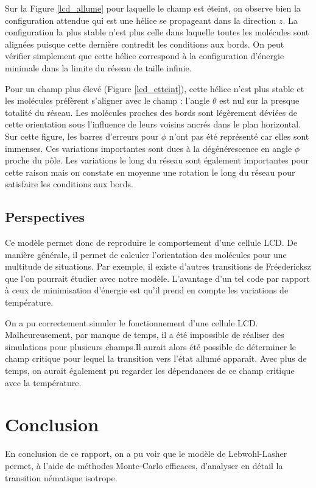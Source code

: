 \documentclass[11pt,a4paper]{article}
\numberwithin{equation}{section}
\begin{document}
Sur la Figure \ref{lcd_allume} pour laquelle le champ est éteint, on observe bien la configuration attendue qui est une hélice se propageant dans la direction $z$. 
La configuration la plus stable n'est plus celle dans laquelle toutes les molécules sont alignées puisque cette dernière contredit les conditions aux bords. On peut vérifier simplement que cette hélice correspond à la configuration d'énergie minimale dans la limite du réseau de taille infinie. 
\medskip

Pour un champ plus élevé (Figure \ref{lcd_etteint}), cette hélice n'est plus stable et les molécules préfèrent s'aligner avec le champ : l'angle $\theta$ est nul sur la presque totalité du réseau. Les molécules proches des bords sont légèrement déviées de cette orientation sous l'influence de leurs voisins ancrés dans le plan horizontal. Sur cette figure, les barres d'erreurs pour $\phi$ n'ont pas été représenté car elles sont immenses. Ces variations importantes sont dues à la dégénérescence en angle $\phi$ proche du pôle. Les variations le long du réseau sont  également importantes pour cette raison mais on constate en moyenne une rotation le long du réseau pour satisfaire les conditions aux bords. 

\subsection{Perspectives}
Ce modèle permet donc de reproduire le comportement d'une cellule LCD. De manière générale, il permet de calculer l'orientation des molécules pour une multitude de situations. Par exemple, il existe d'autres transitions de Fréedericksz que l'on pourrait étudier avec notre modèle. L'avantage d'un tel code par rapport à ceux de minimisation d'énergie est qu'il prend en compte les variations de température. 
\medskip

On a pu correctement simuler le fonctionnement d'une cellule LCD. Malheureusement, par manque de temps, il a été impossible de réaliser des simulations pour plusieurs champs.Il aurait alors été possible de déterminer le champ critique pour lequel la transition vers l'état allumé apparaît. Avec plus de temps, on aurait également pu regarder les dépendances de ce champ critique avec la température.


\section*{Conclusion}
En conclusion de ce rapport, on a pu voir que le modèle de Lebwohl-Lasher permet, à l'aide de méthodes Monte-Carlo efficaces, d'analyser en détail la transition nématique isotrope. 
\medskip
\end{document}
